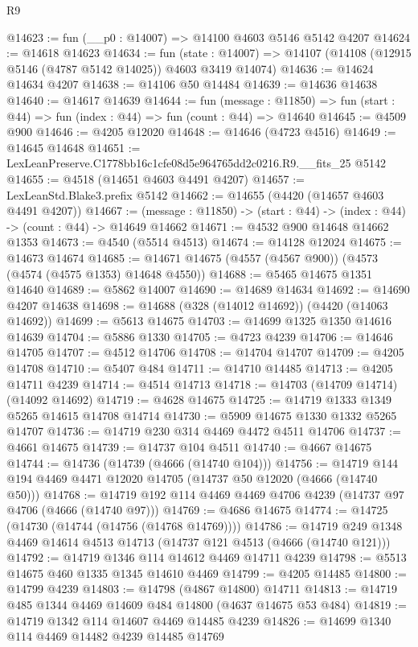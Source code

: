 \begin{lexlean}{R9}
\begin{coremodule}
@14623 := fun (__p0 : @14007) => @14100 @4603 @5146 @5142 @4207
@14624 := @14618 @14623
@14634 := fun (state : @14007) =>
  @14107 (@14108 (@12915 @5146 (@4787 @5142 @14025)) @4603 @3419 @14074)
@14636 := @14624 @14634 @4207
@14638 := @14106 @50 @14484
@14639 := @14636 @14638
@14640 := @14617 @14639
@14644 := fun (message : @11850) =>
  fun (start : @44) => fun (index : @44) => fun (count : @44) => @14640
@14645 := @4509 @900
@14646 := @4205 @12020
@14648 := @14646 (@4723 @4516)
@14649 := @14645 @14648
@14651 := LexLeanPreserve.C1778bb16c1cfe08d5e964765dd2c0216.R9.__fits_25 @5142
@14655 := @4518 (@14651 @4603 @4491 @4207)
@14657 := LexLeanStd.Blake3.prefix @5142
@14662 := @14655 (@4420 (@14657 @4603 @4491 @4207))
@14667 := (message : @11850) -> (start : @44) -> (index : @44) -> (count : @44) -> @14649 @14662
@14671 := @4532 @900 @14648 @14662 @1353
@14673 := @4540 (@5514 @4513)
@14674 := @14128 @12024
@14675 := @14673 @14674
@14685 := @14671 @14675 (@4557 (@4567 @900)) (@4573 (@4574 (@4575 @1353) @14648 @4550))
@14688 := @5465 @14675 @1351 @14640
@14689 := @5862 @14007
@14690 := @14689 @14634
@14692 := @14690 @4207 @14638
@14698 := @14688 (@328 (@14012 @14692)) (@4420 (@14063 @14692))
@14699 := @5613 @14675
@14703 := @14699 @1325 @1350 @14616 @14639
@14704 := @5886 @1330
@14705 := @4723 @4239
@14706 := @14646 @14705
@14707 := @4512 @14706
@14708 := @14704 @14707
@14709 := @4205 @14708
@14710 := @5407 @484
@14711 := @14710 @14485
@14713 := @4205 @14711 @4239
@14714 := @4514 @14713
@14718 := @14703 (@14709 @14714) (@14092 @14692)
@14719 := @4628 @14675
@14725 := @14719 @1333 @1349 @5265 @14615 @14708 @14714
@14730 := @5909 @14675 @1330 @1332 @5265 @14707
@14736 := @14719 @230 @314 @4469 @4472 @4511 @14706
@14737 := @4661 @14675
@14739 := @14737 @104 @4511
@14740 := @4667 @14675
@14744 := @14736 (@14739 (@4666 (@14740 @104)))
@14756 := @14719 @144 @194 @4469 @4471 @12020 @14705 (@14737 @50 @12020 (@4666 (@14740 @50)))
@14768 := @14719 @192 @114 @4469 @4469 @4706 @4239 (@14737 @97 @4706 (@4666 (@14740 @97)))
@14769 := @4686 @14675
@14774 := @14725 (@14730 (@14744 (@14756 (@14768 @14769))))
@14786 := @14719 @249 @1348 @4469 @14614 @4513 @14713 (@14737 @121 @4513 (@4666 (@14740 @121)))
@14792 := @14719 @1346 @114 @14612 @4469 @14711 @4239
@14798 := @5513 @14675 @460 @1335 @1345 @14610 @4469
@14799 := @4205 @14485
@14800 := @14799 @4239
@14803 := @14798 (@4867 @14800) @14711
@14813 := @14719 @485 @1344 @4469 @14609 @484 @14800 (@4637 @14675 @53 @484)
@14819 := @14719 @1342 @114 @14607 @4469 @14485 @4239
@14826 := @14699 @1340 @114 @4469 @14482 @4239 @14485 @14769

\end{coremodule}
\end{lexlean}
